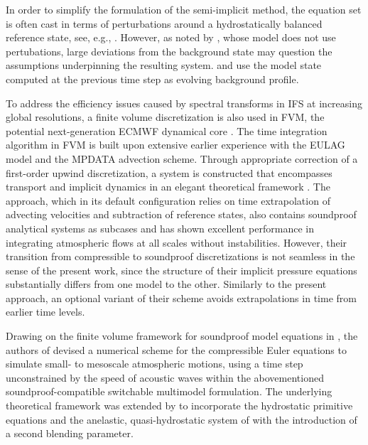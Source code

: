 \documentclass{ametsoc}
\theoremstyle{definition}
\begin{document}
In order to simplify the formulation of the semi-implicit method, the equation set is often cast in terms of perturbations around a hydrostatically balanced reference state, see, e.g., \cite{RestelliGiraldo2009,SmolarkiewiczEtAl2014,SmolarkiewiczEtAl2019}. However, as noted by \cite{WellerShahrokhi2014}, whose model does not use pertubations, large deviations from the background state may question the assumptions underpinning the resulting system. \cite{WoodEtAl2013} and \cite{MelvinEtAl2018} use the model state computed at the previous time step as evolving background profile.

To address the efficiency issues caused by spectral transforms in IFS at increasing global resolutions, a finite volume discretization is also used in FVM, the potential next-generation ECMWF dynamical core \citep{KuehnleinEtAl2019}. The time integration algorithm in FVM is built upon extensive earlier experience with the EULAG model and the MPDATA advection scheme. Through appropriate correction of a first-order upwind discretization, a system is constructed that encompasses transport and implicit dynamics in an elegant theoretical framework \citep[and references therein]{SmolarkiewiczEtAl2014, SmolarkiewiczEtAl2016}. The approach, which in its default configuration relies on time extrapolation of advecting velocities and subtraction of reference states, also contains soundproof analytical systems as subcases and has shown excellent performance in integrating atmospheric flows at all scales without instabilities. However, their transition from compressible to soundproof discretizations is not seamless in the sense of the present work, since the structure of their implicit pressure equations substantially differs from one model to the other. Similarly to the present approach, an optional variant of their scheme avoids extrapolations in time from earlier time levels.

Drawing on the finite volume framework for soundproof model equations in \citet{KleinTCFD2009}, the authors of \citet{Benacchio2014, BenacchioEtAl2014} devised a numerical scheme for the compressible Euler equations to simulate small- to mesoscale atmospheric motions, using a time step unconstrained by the speed of acoustic waves within the abovementioned soundproof-compatible switchable multimodel formulation. The underlying theoretical framework was extended by \citet{KleinBenacchio2016} to incorporate the hydrostatic primitive equations and the anelastic, quasi-hydrostatic system of \cite{ArakawaKonor2009} with the introduction of a second blending parameter.
\end{document}
